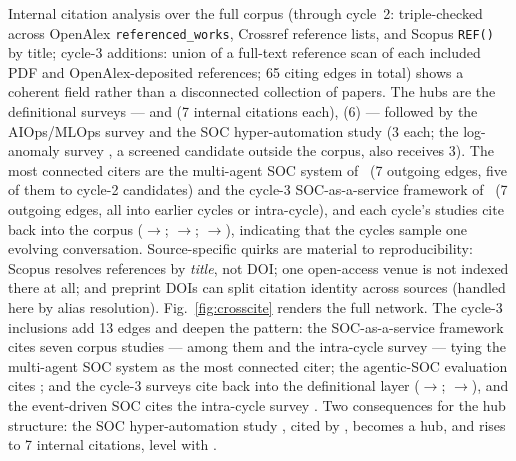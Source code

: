 \documentclass{ieeeaccess}
\begin{document}
Internal citation analysis over the full corpus (through cycle~2:
triple-checked across OpenAlex \texttt{referenced\_works}, Crossref
reference lists, and Scopus \texttt{REF()} by title; cycle-3 additions:
union of a full-text reference scan of each included PDF and
OpenAlex-deposited references; 65 citing edges in total) shows a
coherent field rather than a disconnected collection of papers. The hubs are the definitional
surveys --- \cite{P10} and \cite{P14} (7 internal citations each),
\cite{P09} (6) --- followed by the AIOps/MLOps survey \cite{P16} and the
SOC hyper-automation study \cite{P76} (3 each; the log-anomaly survey
\cite{P65}, a screened candidate outside the corpus, also receives 3).
The most connected citers are the multi-agent SOC system of~\cite{P28}
(7 outgoing edges, five of them to cycle-2 candidates) and the cycle-3
SOC-as-a-service framework of~\cite{P97} (7 outgoing edges, all into
earlier cycles or intra-cycle), and each cycle's studies cite back into
the corpus (\cite{P79}$\rightarrow$\cite{P20,P78};
\cite{P76}$\rightarrow$\cite{P39,P83};
\cite{P93}$\rightarrow$\cite{P06,P76}), indicating that the cycles
sample one evolving conversation. Source-specific quirks are material
to reproducibility: Scopus resolves references by \emph{title}, not
DOI; one open-access venue is not indexed there at all; and preprint
DOIs can split citation identity across sources (handled here by alias
resolution). Fig.~\ref{fig:crosscite} renders the full network. The
cycle-3 inclusions add 13 edges and deepen the pattern: the
SOC-as-a-service framework \cite{P97} cites seven corpus studies ---
among them \cite{P14,P73,P76,P79} and the intra-cycle survey \cite{P121}
--- tying the multi-agent SOC system \cite{P28} as the most connected
citer; the agentic-SOC evaluation \cite{P93} cites \cite{P06,P76}; and
the cycle-3 surveys cite back into the definitional layer
(\cite{P112}$\rightarrow$\cite{P05}; \cite{P121}$\rightarrow$\cite{P14}),
and the event-driven SOC \cite{P101} cites the intra-cycle survey
\cite{P121}. Two consequences for the hub structure: the SOC
hyper-automation study \cite{P76}, cited by \cite{P28,P93,P97}, becomes
a hub, and \cite{P14} rises to 7 internal citations, level with
\cite{P10}.
\end{document}
